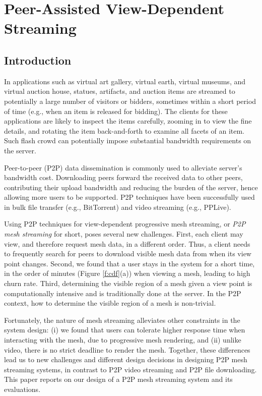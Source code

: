 \chapter{Peer-Assisted View-Dependent Streaming}
\label{c:p2p}
\section{Introduction}
    In applications such as virtual art gallery, virtual
    earth, virtual museums, and virtual auction house,
    statues, artifacts, and auction items are streamed to
    potentially a large number of visitors or bidders,
    sometimes within a short period of time (e.g., when an
    item is released for bidding).  The clients for these
    applications are likely to inspect the items carefully,
    zooming in to view the fine details, and rotating the
    item back-and-forth to examine all facets of an item.
    Such flash crowd can potentially impose substantial
    bandwidth requirements on the server.

    Peer-to-peer (P2P) data dissemination is commonly used to
    alleviate server's bandwidth cost.  Downloading
    peers forward the received data to other peers,
    contributing their upload bandwidth and reducing the
    burden of the server, hence allowing more users to
    be supported.  P2P techniques have been successfully used 
    in bulk file transfer (e.g., BitTorrent) and video
    streaming (e.g., PPLive).

    Using P2P techniques for view-dependent progressive mesh
    streaming, or \textit{P2P mesh streaming} for short, poses 
    several new challenges.  First, each
    client may view, and therefore request mesh data, in a 
    different order.
    Thus, a client needs
    to frequently search for peers to download visible mesh
    data from when its view point changes.  Second, we
    found that a user stays in the system for a short time,
    in the order of minutes
    (Figure \ref{f:cdf}(a))
    when viewing a mesh, leading to high churn rate.  Third,
    determining the visible region of a mesh given a view
    point is computationally intensive and is
    traditionally done at the server.  In the P2P context,
    how to determine the visible region of a mesh is
    non-trivial.

    Fortunately, the nature of mesh streaming alleviates
    other constraints in the system design:  (i) we found
    that users can tolerate higher response time when
    interacting with the mesh, due to progressive mesh rendering, 
    and (ii) unlike video, there is no strict 
    deadline to render the mesh.
    Together, these differences 
    lead us to new challenges and different design decisions in 
    designing P2P mesh streaming systems, in contrast to P2P
    video streaming and P2P file downloading.  This paper
    reports on our design of a P2P mesh streaming system and
    its evaluations.

